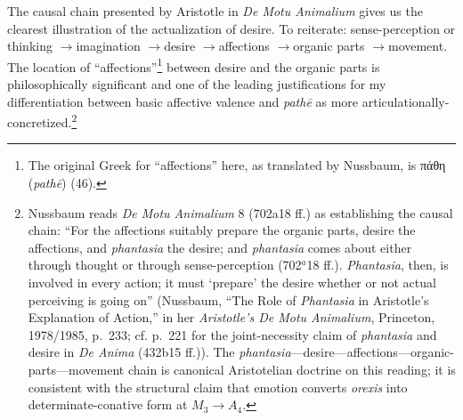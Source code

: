 \documentclass{article}
\newcommand{\gk}[1]{{\greekfont #1}}
\newcommand{\ra}{\ensuremath{\rightarrow}}
\begin{document}
The causal chain presented by Aristotle in \textit{De Motu Animalium} gives us the clearest illustration of the actualization of desire. To reiterate: sense-perception or thinking \ra imagination \ra desire \ra affections \ra organic parts \ra movement. The location of ``affections''\footnote{The original Greek for ``affections'' here, as translated by Nussbaum, is \gk{πάθη} (\textit{pathē}) (46).} between desire and the organic parts is philosophically significant and one of the leading justifications for my differentiation between basic affective valence and \textit{pathē} as more articulationally-concretized.\footnote{Nussbaum reads \textit{De Motu Animalium} 8 (702a18 ff.) as establishing the causal chain: ``For the affections suitably prepare the organic parts, desire the affections, and \textit{phantasia} the desire; and \textit{phantasia} comes about either through thought or through sense-perception (702$^{a}$18 ff.). \textit{Phantasia}, then, is involved in every action; it must `prepare' the desire whether or not actual perceiving is going on'' (Nussbaum, ``The Role of \textit{Phantasia} in Aristotle's Explanation of Action,'' in her \textit{Aristotle's De Motu Animalium}, Princeton, 1978/1985, p.~233; cf. p.~221 for the joint-necessity claim of \textit{phantasia} and desire in \textit{De Anima} (432b15 ff.)). The \textit{phantasia}---desire---affections---organic-parts---movement chain is canonical Aristotelian doctrine on this reading; it is consistent with the structural claim that emotion converts \textit{orexis} into determinate-conative form at $M_3 \rightarrow A_4$.}
\end{document}
